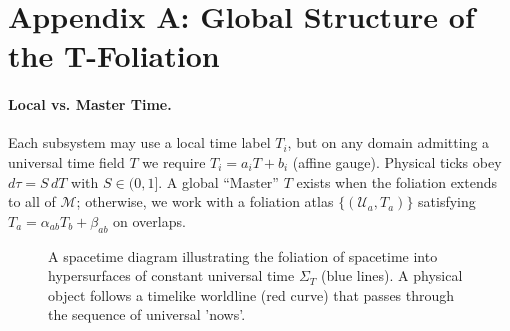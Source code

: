 \documentclass[12pt]{article}
\theoremstyle{plain}
\begin{document}
\section*{}

\appendix
\section{Appendix A: Global Structure of the T-Foliation}

\paragraph{Local vs. Master Time.}
Each subsystem may use a local time label $T_i$, but on any domain admitting a universal time field $T$ we require $T_i = a_i T + b_i$ (affine gauge). Physical ticks obey $d\tau = S\,dT$ with $S\in(0,1]$. A global “Master” $T$ exists when the foliation extends to all of $\mathcal{M}$; otherwise, we work with a foliation atlas $\{(\mathcal{U}_a, T_a)\}$ satisfying $T_a = \alpha_{ab}T_b + \beta_{ab}$ on overlaps.

\begin{figure}[h!]
    \centering
    \caption{A spacetime diagram illustrating the foliation of spacetime into hypersurfaces of constant universal time $\Sigma_T$ (blue lines). A physical object follows a timelike worldline (red curve) that passes through the sequence of universal 'nows'.}
    \label{fig:foliation}
\end{figure}
\end{document}
